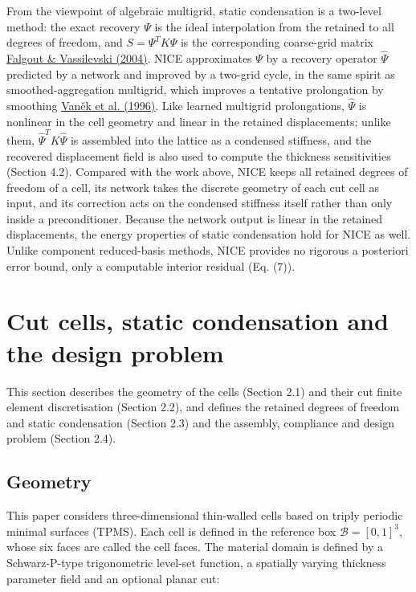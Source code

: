 \documentclass[preprint,12pt,authoryear]{elsarticle}
\begin{document}
From the viewpoint of algebraic multigrid, static condensation is a two-level method: the exact recovery \(\Psi\) is the ideal interpolation from the retained to all degrees of freedom, and \(S=\Psi^TK\Psi\) is the corresponding coarse-grid matrix \href{https://doi.org/10.1137/S0036142903429742}{Falgout \& Vassilevski (2004)}. NICE approximates \(\Psi\) by a recovery operator \(\widehat\Psi\) predicted by a network and improved by a two-grid cycle, in the same spirit as smoothed-aggregation multigrid, which improves a tentative prolongation by smoothing \href{https://doi.org/10.1007/BF02238511}{Vaněk et al. (1996)}. Like learned multigrid prolongations, \(\widehat\Psi\) is nonlinear in the cell geometry and linear in the retained displacements; unlike them, \(\widehat\Psi^TK\widehat\Psi\) is assembled into the lattice as a condensed stiffness, and the recovered displacement field is also used to compute the thickness sensitivities (Section 4.2). Compared with the work above, NICE keeps all retained degrees of freedom of a cell, its network takes the discrete geometry of each cut cell as input, and its correction acts on the condensed stiffness itself rather than only inside a preconditioner. Because the network output is linear in the retained displacements, the energy properties of static condensation hold for NICE as well. Unlike component reduced-basis methods, NICE provides no rigorous a posteriori error bound, only a computable interior residual (Eq. (7)).

\section{Cut cells, static condensation and the design problem}

This section describes the geometry of the cells (Section 2.1) and their cut finite element discretisation (Section 2.2), and defines the retained degrees of freedom and static condensation (Section 2.3) and the assembly, compliance and design problem (Section 2.4).

\subsection{Geometry}

This paper considers three-dimensional thin-walled cells based on triply periodic minimal surfaces (TPMS). Each cell is defined in the reference box \(\mathcal B=[0,1]^3\), whose six faces are called the cell faces. The material domain is defined by a Schwarz-P-type trigonometric level-set function, a spatially varying thickness parameter field and an optional planar cut:
\end{document}
